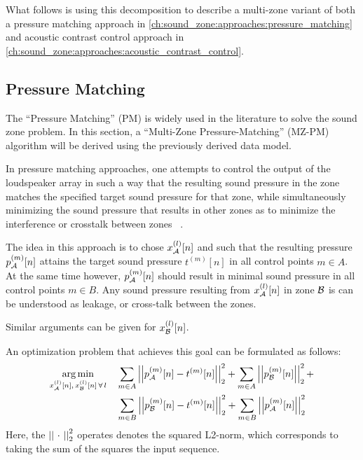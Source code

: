 What follows is using this decomposition to describe a multi-zone variant of both a pressure matching approach 
in \autoref{ch:sound_zone:approaches:pressure_matching}
and acoustic contrast control approach in \autoref{ch:sound_zone:approaches:acoustic_contrast_control}.

\subsection{Pressure Matching}
\label{ch:sound_zone:approaches:pressure_matching}
The ``Pressure Matching'' (PM) is widely used in the literature to solve the sound zone problem.
In this section, a ``Multi-Zone Pressure-Matching'' (MZ-PM) algorithm will be derived using the previously derived data model.

In pressure matching approaches, one attempts to control the output of the loudspeaker array in such a way that the resulting sound pressure in the zone 
matches the specified target sound pressure for that zone, 
while simultaneously minimizing the sound pressure that results in other zones as to minimize the interference or crosstalk between zones
~\cite{betlehem2015personal, olik2013comparative}.

The idea in this approach is to chose $x_{\mathcal{A}}^{(l)}[n]$ and such that the resulting pressure 
$p_{\mathcal{A}}^{(m)}[n]$ attains the target sound pressure $t^{(m)}[n]$ in all control points $m \in A$.   
At the same time however, $p_{\mathcal{A}}^{(m)}[n]$ should result in minimal sound pressure in all control points $m \in B$.
Any sound pressure resulting from $x_{\mathcal{A}}^{(l)}[n]$ in zone $\mathcal{B}$ is can be understood as leakage, or cross-talk between the zones. 

Similar arguments can be given for $x_{\mathcal{B}}^{(l)}[n]$.

An optimization problem that achieves this goal can be formulated as follows:
\begin{align}
    \argmin{x_\za^{(l)}[n],\,x_\zb^{(l)}[n]\,\forall\,l}{
       &\sum_{m\in A} \norm[2][2]{p_\za^{(m)}[n] - t^{(m)}[n]} +
        \sum_{m\in A} \norm[2][2]{p_\zb^{(m)}[n]} + \\
       &\sum_{m\in B} \norm[2][2]{p_\zb^{(m)}[n] - t^{(m)}[n]} + 
        \sum_{m\in B} \norm[2][2]{p_\za^{(m)}[n]}
    }
\end{align}
Here, the $\norm[2][2]{\,\,\cdot\,\,}$ operates denotes the squared L2-norm, which corresponds to taking the sum of the squares the input sequence. 

